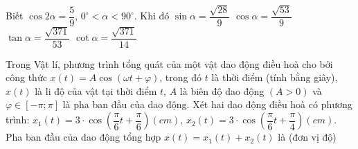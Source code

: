 \begin{ex}
Biết $\cos 2 \alpha=\dfrac{5}{9}$, $0^\circ<\alpha<90^\circ$. Khi đó
\choiceTF
{\True $\sin \alpha=\dfrac{\sqrt{28}}{9}$}
{\True $\cos \alpha=\dfrac{\sqrt{53}}{9}$}
{$\tan \alpha =\dfrac{\sqrt{371}}{53}$}
{\True $\cot \alpha =\dfrac{\sqrt{371}}{14}$}
\end{ex}

\begin{ex}
Trong Vật lí, phương trình tổng quát của một vật dao động điều hoà cho bởi công thức $x(t)=A \cos (\omega t+\varphi)$, trong đó $t$ là thời điểm (tính bằng giây), $x(t)$ là li độ của vật tại thời điểm $t$, $A$ là biên độ dao động $(A>0)$ và $\varphi \in[-\pi; \pi]$ là pha ban đầu của dao động. Xét hai dao động điều hoà có phương trình: $x_1(t)=3 \cdot \cos \left(\dfrac{\pi}{6} t+\dfrac{\pi}{6}\right)(cm)$, $x_2(t)=3 \cdot \cos \left(\dfrac{\pi}{6} t+\dfrac{\pi}{4}\right)(cm)$. Pha ban đầu của dao động tổng hợp $x(t)=x_1(t)+x_2(t)$ là (đơn vị độ)
\end{ex}

